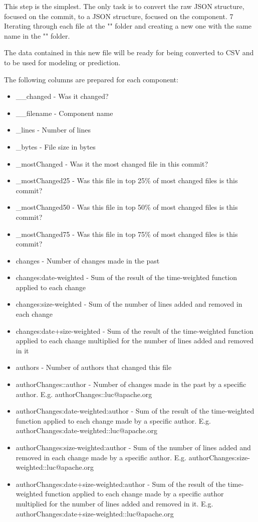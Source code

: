 This step is the simplest. The only task is to convert the raw JSON structure, focused on the commit, to a JSON structure, focused on the component. 7
Iterating through each file at the "" folder and creating a new one with the same name in the "" folder.

The data contained in this new file will be ready for being converted to CSV and to be used for modeling or prediction.

The following columns are prepared for each component:
%
\begin{itemize}
\item \_\_changed - Was it changed?
\item \_\_filename - Component name
\item \_lines - Number of lines
\item \_bytes - File size in bytes
\item \_mostChanged - Was it the most changed file in this commit?
\item \_mostChanged25 - Was this file in top 25\% of most changed files is this commit?
\item \_mostChanged50 - Was this file in top 50\% of most changed files is this commit?
\item \_mostChanged75 - Was this file in top 75\% of most changed files is this commit?
\item changes - Number of changes made in the past
\item changes:date-weighted - Sum of the result of the time-weighted function applied to each change
\item changes:size-weighted - Sum of the number of lines added and removed in each change
\item changes:date+size-weighted - Sum of the result of the time-weighted function applied to each change multiplied for the number of lines added and removed in it
\item authors - Number of authors that changed this file
\item authorChanges::{author} - Number of changes made in the past by a specific author. E.g. authorChanges::luc@apache.org
\item authorChanges:date-weighted:{author} - Sum of the result of the time-weighted function applied to each change made by a specific author. E.g. authorChanges:date-weighted::luc@apache.org
\item authorChanges:size-weighted:{author} - Sum of the number of lines added and removed in each change made by a specific author. E.g. authorChanges:size-weighted::luc@apache.org
\item authorChanges:date+size-weighted:{author} - Sum of the result of the time-weighted function applied to each change made by a specific author multiplied for the number of lines added and removed in it. E.g. authorChanges:date+size-weighted::luc@apache.org
\end{itemize}

